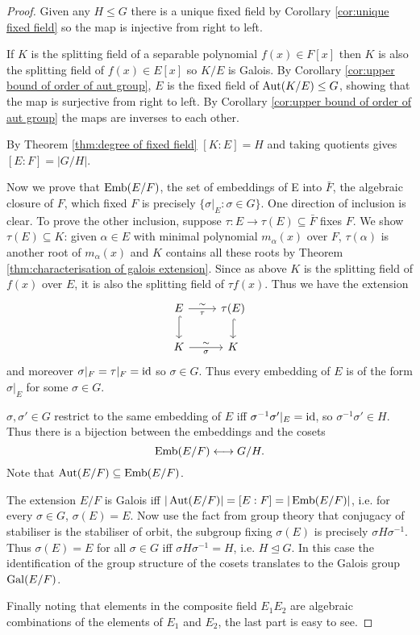 \documentclass[a4paper]{article}
\begin{document}
\begin{proof}
  Given any $H \leq G$ there is a unique fixed field by Corollary \ref{cor:unique fixed field} so the map is injective from right to left.

  If $K$ is the splitting field of a separable polynomial $f(x) \in F[x]$ then $K$ is also the splitting field of $f(x) \in E[x]$ so $K/E$ is Galois. By Corollary \ref{cor:upper bound of order of aut group}, $E$ is the fixed field of $\operatorname{Aut}(K/E) \leq G$, showing that the map is surjective from right to left. By Corollary \ref{cor:upper bound of order of aut group} the maps are inverses to each other.

  By Theorem \ref{thm:degree of fixed field} $[K:E] = H$ and taking quotients gives $[E:F] = |G/H|$.

  Now we prove that $\operatorname{Emb}(E/F)$, the set of embeddings of E into $\bar F$, the algebraic closure of $F$, which fixed $F$ is precisely $\{ \sigma|_E: \sigma \in G \}$. One direction of inclusion is clear. To prove the other inclusion, suppose $\tau : E \rightarrow \tau(E) \subseteq \bar F$ fixes $F$. We show $\tau(E) \subseteq K$: given $\alpha \in E$ with minimal polynomial $m_\alpha(x)$ over $F$, $\tau(\alpha)$ is another root of $m_\alpha(x)$ and $K$ contains all these roots by Theorem \ref{thm:characterisation of galois extension}. Since as above $K$ is the splitting field of $f(x)$ over $E$, it is also the splitting field of $\tau f(x)$. Thus we have the extension
  \[
    \begin{tikzcd}
      E \arrow{r}{\sim}[swap]{\tau} \arrow[hook]{d} & \tau(E) \arrow[hook]{d} \\
      K \arrow{r}{\sim}[swap]{\sigma} & K
    \end{tikzcd}
  \]
  and moreover $\sigma|_F = \tau|_F = \operatorname{id}$ so $\sigma \in G$. Thus every embedding of $E$ is of the form $\sigma|_E$ for some $\sigma \in G$.

  $\sigma, \sigma' \in G$ restrict to the same embedding of $E$ iff $\sigma^{-1} \sigma' |_E = \operatorname{id}$, so $\sigma^{-1} \sigma' \in H$. Thus there is a bijection between the embeddings and the cosets
  \[ \operatorname{Emb}(E/F) \longleftrightarrow G/H. \]
  Note that $\operatorname{Aut}(E/F) \subseteq \operatorname{Emb}(E/F)$.

  The extension $E/F$ is Galois iff $|\operatorname{Aut}(E/F)| = [E:F] = |\operatorname{Emb}(E/F)|$, i.e. for every $\sigma \in G$, $\sigma(E) = E$. Now use the fact from group theory that conjugacy of stabiliser is the stabiliser of orbit, the subgroup fixing $\sigma(E)$ is precisely $\sigma H \sigma^{-1}$. Thus $\sigma(E) = E$ for all $\sigma \in G$ iff $\sigma H \sigma^{-1} = H$, i.e. $H \trianglelefteq G$. In this case the identification of the group structure of the cosets translates to the Galois group $\operatorname{Gal}(E/F)$.

  Finally noting that elements in the composite field $E_1E_2$ are algebraic combinations of the elements of $E_1$ and $E_2$, the last part is easy to see.
\end{proof}
\end{document}
